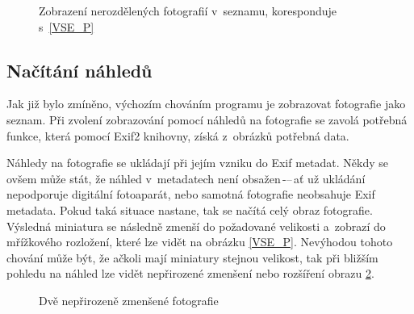 \begin{figure}[h]
\begin{center}
\caption{Zobrazení nerozdělených fotografií v~seznamu, koresponduje s~\ref{VSE_P}}
\label{VSE_S}
\end{center}
\end{figure}

\subsection*{Načítání náhledů}

Jak již bylo zmíněno, výchozím chováním programu je zobrazovat fotografie jako seznam. Při zvolení zobrazování pomocí náhledů na fotografie se zavolá potřebná funkce, která pomocí Exif2 knihovny, získá z~obrázků potřebná data.

Náhledy na fotografie se ukládají při jejím vzniku do Exif metadat. Někdy se ovšem může stát, že náhled v~metadatech není obsažen\,-–\,ať už ukládání nepodporuje digitální fotoaparát, nebo samotná fotografie neobsahuje Exif metadata. Pokud taká situace nastane, tak se načítá celý obraz fotografie. Výsledná miniatura se následně zmenší do požadované velikosti a~zobrazí do mřížkového rozložení, které lze vidět na obrázku \ref{VSE_P}. Nevýhodou tohoto chování může být, že ačkoli mají miniatury stejnou velikost, tak při bližším pohledu na náhled lze vidět nepřirozené zmenšení nebo rozšíření obrazu \ref{VSE_P_NEPR}.

\begin{figure}[h]
\begin{center}
\caption{Dvě nepřirozeně zmenšené fotografie}
\label{VSE_P_NEPR}
\end{center}
\end{figure}

